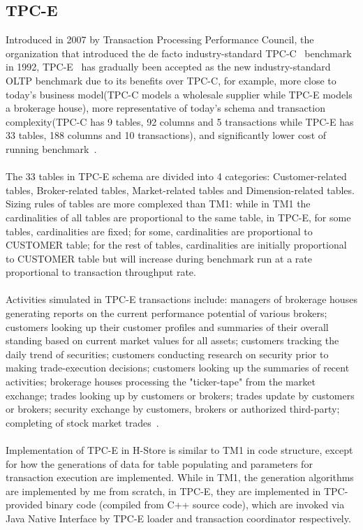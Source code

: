 \documentclass[a4paper,10pt]{article}
\begin{document}
\subsection{TPC-E}
Introduced in 2007 by Transaction Processing Performance Council, the organization that introduced the de facto industry-standard TPC-C~\cite{tpc-c} benchmark in 1992, TPC-E~\cite{tpc-e} has gradually been accepted as the new industry-standard OLTP benchmark due to its benefits over TPC-C, for example, more close to today's business model(TPC-C models a wholesale supplier while TPC-E models a brokerage house), more representative of today's schema and transaction complexity(TPC-C has 9 tables, 92 columns and 5 transactions while TPC-E has 33 tables, 188 columns and 10 transactions), and significantly lower cost of running benchmark~\cite{tpce-cost, tpcc-cost}.
\\\\
The 33 tables in TPC-E schema are divided into 4 categories: Customer-related tables, Broker-related tables, Market-related tables and Dimension-related tables. Sizing rules of tables are more complexed than TM1: while in TM1 the cardinalities of all tables are proportional to the same table, in TPC-E, for some tables, cardinalities are fixed; for some, cardinalities are proportional to CUSTOMER table; for the rest of tables, cardinalities are initially proportional to CUSTOMER table but will increase during benchmark run at a rate proportional to transaction throughput rate.
\\\\
Activities simulated in TPC-E transactions include: managers of brokerage houses generating reports on the current performance potential of various brokers; customers looking up their customer profiles and summaries of their overall standing based on current market values for all assets; customers tracking the daily trend of securities; customers conducting research on security prior to making trade-execution decisions; customers looking up the summaries of recent activities; brokerage houses processing the "ticker-tape" from the market exchange; trades looking up by customers or brokers; trades update by customers or brokers; security exchange by customers, brokers or authorized third-party; completing of stock market trades~\cite{tpce-activities}. 
\\\\
Implementation of TPC-E in H-Store is similar to TM1 in code structure, except for how the generations of data for table populating and parameters for transaction execution are implemented. While in TM1, the generation algorithms are implemented by me from scratch, in TPC-E, they are implemented in TPC-provided binary code (compiled from C++ source code), which are invoked via Java Native Interface by TPC-E loader and transaction coordinator respectively.
\end{document}
